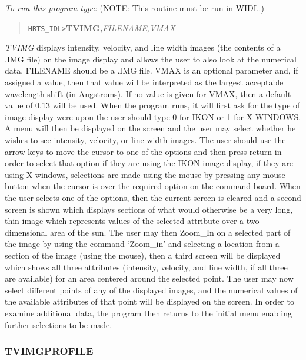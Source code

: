 {\em To run this program type:} (NOTE: This routine must be run in WIDL.)
\begin{quote}
{\tt HRTS\_IDL>}{\bf TVIMG,}{\it FILENAME,VMAX}                 
\end{quote}
{\em TVIMG} displays intensity, velocity, and line width images (the
   contents of a .IMG file) on the image display and allows the user to also 
look at
   the numerical data.  FILENAME should be a .IMG file. VMAX is an optional 
parameter
   and, if assigned a value, then that value will be interpreted as the
   largest acceptable wavelength shift (in Angstroms).  If no value is
   given for VMAX, then a default value of 0.13 will be used.  When the
   program runs, it will first ask for the type of image display  
   were upon the user should type 0 for IKON or 1 for X-WINDOWS. 
   A menu will then be displayed on the screen and 
   the user may select whether he wishes to see intensity, velocity, or
   line width images.  The user should use the arrow keys to move the
   cursor to one of the options and then press return in
   order to select that option if they are using the IKON image 
   display, if they are using X-windows, selections are made using the mouse by 
   pressing any mouse button when the cursor is over the required 
   option on the command board. 
   When the user selects one of the options, then the
   current screen is cleared and a second screen is shown which displays
   sections of what would otherwise be a very long, thin image which
   represents values of the selected attribute over a two-dimensional area
   of the sun. The user may then Zoom\_In on a selected part of the 
   image by using the command `Zoom\_in' and selecting a location from a section 
of the image
   (using the mouse), then a third screen will be displayed which shows all 
three attributes
   (intensity, velocity, and line width, if all three are available) for
   an area centered around the selected point.  The user may now select
   different points of any of the displayed images, and the numerical
   values of the available attributes of that point will be displayed on
   the screen.  In order to examine additional data, the program then returns
   to the initial menu enabling further selections to be made.

\subsubsection{TVIMGPROFILE}


